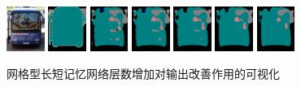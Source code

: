 \begin{figure}[h]
	\centering
	\enspace
	\enspace
	\enspace\thinspace
	\enspace\thinspace
	\enspace\thinspace
	\enspace\thinspace
	\\
	\includegraphics[width=0.11\textwidth]{demo_images/improvement/2007_000663.jpg}
	\enspace\enspace %
	\includegraphics[width=0.11\textwidth]{demo_images/improvement/2007_000663.png}
	\enspace\enspace
	\includegraphics[width=0.11\textwidth]{demo_images/improvement/2007_000663_1.png}
	\enspace\enspace
	\includegraphics[width=0.11\textwidth]{demo_images/improvement/2007_000663_2.png}
	\enspace\enspace
	\includegraphics[width=0.11\textwidth]{demo_images/improvement/2007_000663_3.png}
	\enspace\enspace
	\includegraphics[width=0.11\textwidth]{demo_images/improvement/2007_000663_4.png}
	\enspace\enspace
	\includegraphics[width=0.11\textwidth]{demo_images/improvement/2007_000663_5.png}
	\enspace\enspace
	\caption[同一网络网格型长短记忆网络时序的增加对输出改善作用的可视化]{网格型长短记忆网络层数增加对输出改善作用的可视化}
	\label{fig:improvement}
\end{figure}